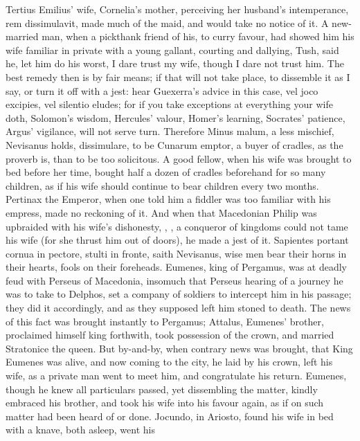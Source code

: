 Tertius Emilius' wife, Cornelia's mother, perceiving her husband's
intemperance, rem dissimulavit, made much of the maid, and would take
no notice of it. A new-married man, when a pickthank friend of his, to
curry favour, had showed him his wife familiar in private with a young
gallant, courting and dallying, \etc{} Tush, said he, let him do his
worst, I dare trust my wife, though I dare not trust him. The best
remedy then is by fair means; if that will not take place, to dissemble
it as I say, or turn it off with a jest: hear Guexerra's advice in this
case, vel joco excipies, vel silentio eludes; for if you take
exceptions at everything your wife doth, Solomon's wisdom, Hercules'
valour, Homer's learning, Socrates' patience, Argus' vigilance, will
not serve turn. Therefore Minus malum, a less mischief, Nevisanus
holds, dissimulare, to be Cunarum emptor, a buyer of cradles, as
the proverb is, than to be too solicitous. A good fellow, when
his wife was brought to bed before her time, bought half a dozen of
cradles beforehand for so many children, as if his wife should continue
to bear children every two months. Pertinax the Emperor, when one
told him a fiddler was too familiar with his empress, made no reckoning
of it. And when that Macedonian Philip was upbraided with his wife's
dishonesty, , \etc{}, a
conqueror of kingdoms could not tame his wife (for she thrust him out
of doors), he made a jest of it. Sapientes portant cornua in pectore,
stulti in fronte, saith Nevisanus, wise men bear their horns in their
hearts, fools on their foreheads. Eumenes, king of Pergamus, was at
deadly feud with Perseus of Macedonia, insomuch that Perseus hearing of
a journey he was to take to Delphos, set a company of soldiers to
intercept him in his passage; they did it accordingly, and as they
supposed left him stoned to death. The news of this fact was brought
instantly to Pergamus; Attalus, Eumenes' brother, proclaimed himself
king forthwith, took possession of the crown, and married Stratonice
the queen. But by-and-by, when contrary news was brought, that King
Eumenes was alive, and now coming to the city, he laid by his crown,
left his wife, as a private man went to meet him, and congratulate his
return. Eumenes, though he knew all particulars passed, yet dissembling
the matter, kindly embraced his brother, and took his wife into his
favour again, as if on such matter had been heard of or done. Jocundo,
in Ariosto, found his wife in bed with a knave, both asleep, went his
